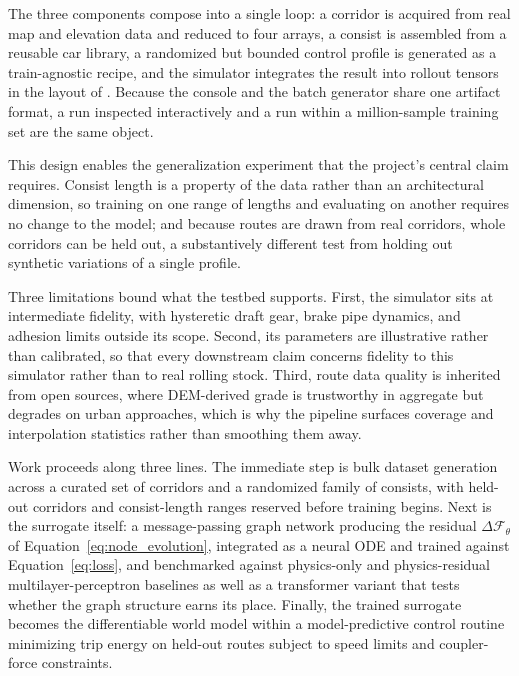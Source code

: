 \documentclass[numbered]{trbunofficial}
\begin{document}
The three components compose into a single loop: a corridor is acquired from real map and elevation data and reduced to four arrays, a consist is assembled from a reusable car library, a randomized but bounded control profile is generated as a train-agnostic recipe, and the simulator integrates the result into rollout tensors in the layout of . Because the console and the batch generator share one artifact format, a run inspected interactively and a run within a million-sample training set are the same object.

This design enables the generalization experiment that the project's central claim requires. Consist length is a property of the data rather than an architectural dimension, so training on one range of lengths and evaluating on another requires no change to the model; and because routes are drawn from real corridors, whole corridors can be held out, a substantively different test from holding out synthetic variations of a single profile.

Three limitations bound what the testbed supports. First, the simulator sits at intermediate fidelity, with hysteretic draft gear, brake pipe dynamics, and adhesion limits outside its scope. Second, its parameters are illustrative rather than calibrated, so that every downstream claim concerns fidelity to this simulator rather than to real rolling stock. Third, route data quality is inherited from open sources, where DEM-derived grade is trustworthy in aggregate but degrades on urban approaches, which is why the pipeline surfaces coverage and interpolation statistics rather than smoothing them away.

Work proceeds along three lines. The immediate step is bulk dataset generation across a curated set of corridors and a randomized family of consists, with held-out corridors and consist-length ranges reserved before training begins. Next is the surrogate itself: a message-passing graph network producing the residual $\Delta\mathcal{F}_\theta$ of Equation~\ref{eq:node_evolution}, integrated as a neural ODE and trained against Equation~\ref{eq:loss}, and benchmarked against physics-only and physics-residual multilayer-perceptron baselines as well as a transformer variant that tests whether the graph structure earns its place. Finally, the trained surrogate becomes the differentiable world model within a model-predictive control routine minimizing trip energy on held-out routes subject to speed limits and coupler-force constraints.
\end{document}
